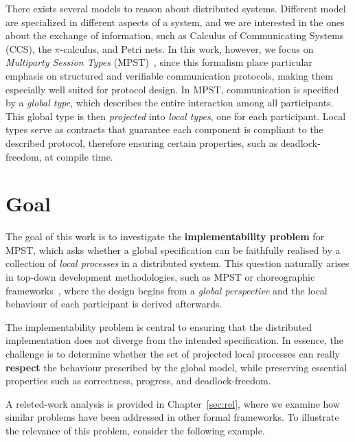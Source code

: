 There exists several models to reason about distributed systems.
Different model are specialized in different aspects of a system, and we
are interested in the ones about the exchange of information, such as
Calculus of Communicating Systems (CCS), the $\pi$-calculus, and Petri nets.
In this work, however, we focus on 
\textit{Multiparty Session Types} (MPST)~\cite{honda2008multiparty},
since this formalism place particular emphasis on structured and 
verifiable communication protocols, making them especially well suited 
for protocol design.
In MPST, communication is specified by a \emph{global type}, which 
describes the entire interaction among all participants. 
This global type is then \emph{projected} into 
\emph{local types}, one for each participant. 
Local types serve as contracts that guarantee each component is compliant 
to the described protocol, therefore ensuring certain properties, 
such as deadlock-freedom, at compile time. 

\section{Goal}
The goal of this work is to investigate the \textbf{implementability
problem} for MPST, which asks whether a global specification can be
faithfully realised by a collection of \textit{local processes} in a
distributed system. This question naturally arises in top-down
development methodologies, such as MPST or choreographic
frameworks~\cite{montesi2014choreographic}, where the design begins
from a \emph{global perspective} and the local behaviour of each
participant is derived afterwards.

The implementability problem is central to ensuring that the
distributed implementation does not diverge from the intended
specification. In essence, the challenge is to determine whether the
set of projected local processes can really \textbf{respect} the
behaviour prescribed by the global model, while preserving essential
properties such as correctness, progress, and deadlock-freedom. 

A releted-work analysis is provided in
Chapter~\ref{sec:rel}, where we examine how similar problems have been
addressed in other formal frameworks.
To illustrate the relevance of this problem, consider the following
example.

\bigskip

